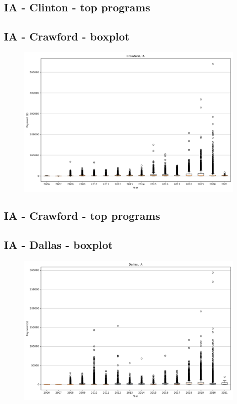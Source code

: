 \subsection*{IA - Clinton - top programs}

\newpage
\subsection*{IA - Crawford - boxplot}
\begin{figure}[h]
\centering
\includegraphics[width=7in]{../output/boxplots/counties/Crawford-IA_boxplot.png}
\end{figure}


\subsection*{IA - Crawford - top programs}

\newpage
\subsection*{IA - Dallas - boxplot}
\begin{figure}[h]
\centering
\includegraphics[width=7in]{../output/boxplots/counties/Dallas-IA_boxplot.png}
\end{figure}


